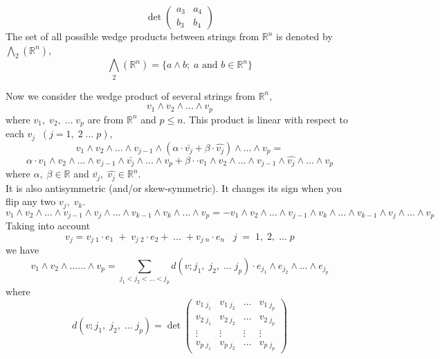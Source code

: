 \documentclass[color=black,11pt]{elegantpaper}
\begin{document}
$$
 \det\left( \begin{array}{cc}
                                       a_3 & a_4 \\
                                       b_3 & b_4
                                   \end{array}\right)
$$
The set of all possible wedge products between strings from $\mathbb{R}^n$  is denoted by ${\bigwedge}_2 (\mathbb{R}^n),$
$$
{\bigwedge}_2 (\mathbb{R}^n) = \{a\wedge b;\; a \mbox{ and } b \in \mathbb{R}^n \}
$$

Now we consider the wedge product of several strings from $\mathbb{R}^n,$
$$
v_1\wedge v_2 \wedge \dots \wedge v_p
$$
where $ v_1,\; v_2, \; \dots \; v_p$ are from $\mathbb{R}^n$ and $ p \le  n.$ This product is linear with respect to each $v_j\;\;(j=1,\;2\;\dots \;p),$
$$
v_1\wedge v_2 \wedge \dots \wedge v_{j-1}\wedge (\alpha \cdot \bar{v_j}+\beta \cdot \hat{v_j})\wedge \dots \wedge v_p =
$$
$$
\alpha \cdot v_1\wedge v_2 \wedge \dots \wedge v_{j-1}\wedge \bar{v_j}\wedge \dots \wedge v_p + \beta \cdot  \cdot v_1\wedge v_2 \wedge \dots \wedge v_{j-1}\wedge \hat{v_j}\wedge \dots \wedge v_p
$$
where $\alpha,\; \beta \in \mathbb{R}$ and $\bar{v_j} ,\; \hat{v_j} \in \mathbb{R}^n.$\\
It is also antisymmetric (and/or skew-symmetric). It changes its sign when you flip any two $v_j,\;v_k.$
$$
v_1\wedge v_2 \wedge \dots \wedge v_{j-1}\wedge v_j\wedge \dots \wedge v_{k-1}\wedge v_k\wedge \dots \wedge v_p = - v_1\wedge v_2 \wedge \dots \wedge v_{j-1}\wedge v_k\wedge \dots \wedge v_{k-1}\wedge v_j\wedge \dots \wedge v_p
$$
Taking into account 
$$
v_j = v_{j\;1} \cdot e_1\;+\;v_{j\; 2} \cdot e_2 + \; \dots \; + v_{j\;n}\cdot e_n\;\;\;j\; =\; 1,\;2,\;\dots \; p
$$
we have 
$$
v_1\wedge v_2 \wedge \dots \dots \wedge v_p = \sum_{j_1<j_2<\dots<j_p} d(v;j_1,\;j_2,\;\dots\;j_p)\cdot e_{j_1}\wedge e_{j_2} \wedge \dots \wedge e_{j_p}
$$
where
\begin{equation}
\label{eq:p_wedge_coordinates}
d(v;j_1,\;j_2,\;\dots\;j_p) = \det \left( \begin{array}{cccc}
                                         v_{1\;j_1}&v_{1\;j_2}&\dots&v_{1\;j_p}\\
                                         v_{2\;j_1}&v_{2\;j_2}&\dots&v_{2\;j_p}\\
                                          \vdots & \vdots & \vdots &\vdots \\
                                         v_{p\;j_1}&v_{p\;j_2}&\dots&v_{p\;j_p}
                                         \end{array}\right)
\end{equation}
\end{document}

